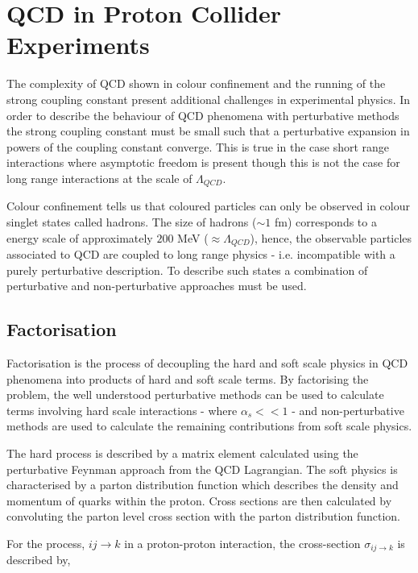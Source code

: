 \section{QCD in Proton Collider Experiments}

The complexity of QCD shown in colour confinement and the running of the strong coupling constant present additional challenges in experimental physics. In order to describe the behaviour of QCD phenomena with perturbative methods the strong coupling constant must be small such that a perturbative expansion in powers of the coupling constant converge. This is true in the case short range interactions where asymptotic freedom is present though this is not the case for long range interactions at the scale of $\Lambda_{QCD}$.

Colour confinement tells us that coloured particles can only be observed in colour singlet states called hadrons. The size of hadrons ($\sim 1$ fm) corresponds to a energy scale of approximately $200$ MeV ($\approx \Lambda_{QCD}$), hence, the observable particles associated to QCD are coupled to long range physics - i.e. incompatible with a purely perturbative description. To describe such states a combination of perturbative and non-perturbative approaches must be used.

\subsection{Factorisation}
Factorisation is the process of decoupling the hard and soft scale physics in QCD phenomena into products of hard and soft scale terms. By factorising the problem, the well understood perturbative methods can be used to calculate terms involving hard scale interactions - where $\alpha_s << 1$ - and non-perturbative methods are used to calculate the remaining contributions from soft scale physics. 

The hard process is described by a matrix element calculated using the perturbative Feynman approach from the QCD Lagrangian. The soft physics is characterised by a parton distribution function which describes the density and momentum of quarks within the proton. Cross sections are then calculated by convoluting the parton level cross section with the parton distribution function.

For the process, $ij \rightarrow k$ in a proton-proton interaction, the cross-section $\sigma_{ij\rightarrow k}$ is described by,

